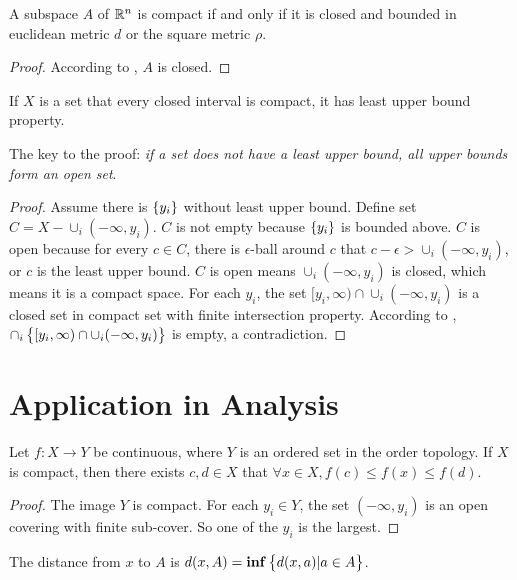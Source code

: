 \begin{theorem}
    A subspace $A$ of $\mathbb{R}^n$ is compact if and only if it is closed and bounded in euclidean metric $d$ or the square metric $\rho$.    
\end{theorem}
\begin{proof}
    According to , $A$ is closed.
\end{proof}

\begin{theorem}
    If $X$ is a set that every closed interval is compact, it has least upper bound property.    
    
    The key to the proof: \emph{if a set does not have a least upper bound, all upper bounds form an open set}.
\end{theorem}
\begin{proof}
    Assume there is $\set{y_i}$ without least upper bound. Define set $C = X - \cup_i (-\infty,y_i)$. $C$ is not empty because $\set{y_i}$ is bounded above. $C$ is open because for every $c\in C$, there is $\epsilon$-ball around $c$ that $c-\epsilon > \cup_i (-\infty,y_i)$, or $c$ is the least upper bound. $C$ is open means $\cup_i (-\infty,y_i)$ is closed, which means it is a compact space. For each $y_i$, the set $[y_i, \infty) \cap \cup_i (-\infty,y_i)$ is a closed set in compact set with finite intersection property. According to , $\cap_i \set{[y_i, \infty) \cap \cup_i (-\infty,y_i)}$ is empty, a contradiction.
\end{proof}




\section{Application in Analysis}

\begin{theorem}
    Let $f: X \rightarrow Y$ be continuous, where $Y$ is an ordered set in the order topology. If $X$ is compact, then there exists $c,d \in X$ that $\forall x \in X, f(c) \leq f(x) \leq f(d)$.
\end{theorem}
\begin{proof}
    The image $Y$ is compact. For each $y_i \in Y$, the set $(-\infty, y_i)$ is an open covering with finite sub-cover. So one of the $y_i$ is the largest.
\end{proof}

\begin{definition}
    The distance from $x$ to $A$ is $d(x,A) = \mathbf{inf} \set{d(x,a) | a \in A}$.
\end{definition}

